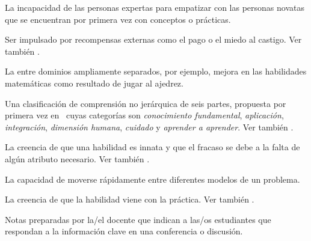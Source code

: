 \begin{description}
 La incapacidad de las personas expertas 
para empatizar con las personas novatas que se encuentran por primera 
vez con conceptos o prácticas.





 Ser impulsado por 
recompensas externas como el pago o el miedo al castigo. Ver
también .






 La  entre dominios ampliamente separados, por ejemplo, mejora en las habilidades matemáticas como resultado de jugar al ajedrez.

 Una clasificación de comprensión no jerárquica 
de seis partes, propuesta por primera vez en~\cite{Fink2013} cuyas categorías son \emph{conocimiento fundamental}, \emph{aplicación}, \emph{integración}, \emph{dimensión humana}, \emph{cuidado} y 
\emph{aprender a aprender}. Ver también .

 La creencia de que una habilidad es innata y que 
el fracaso se debe a la falta de algún atributo necesario. Ver también
.




 La capacidad de moverse
rápidamente entre diferentes modelos de un problema.













 La creencia de que la habilidad 
viene con la práctica. Ver también .

 Notas preparadas por la/el docente que indican a las/os 
estudiantes que respondan a la información clave en una conferencia o discusión.








\end{description}
